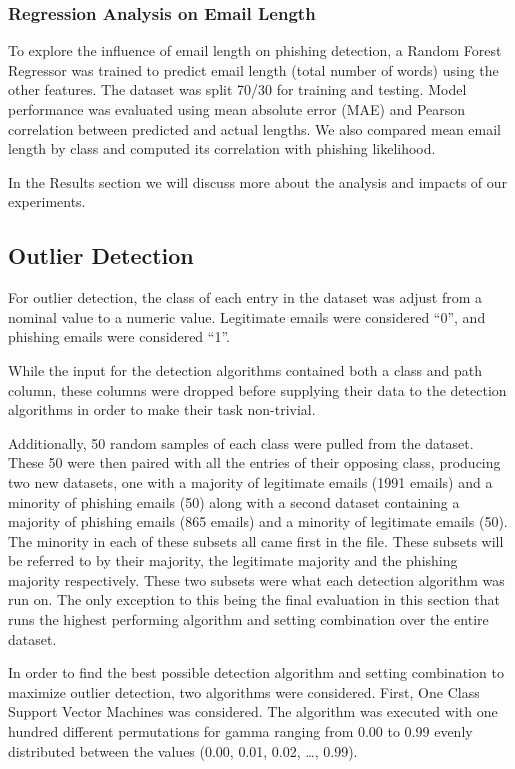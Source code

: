 \documentclass[article,pdftex,10pt,a4paper,twocolumn]{article}
\begin{document}
\subsubsection{Regression Analysis on Email Length}
\label{modelsregressionanalysisonemaillength}

To explore the influence of email length on phishing detection, a Random Forest Regressor was trained to predict email length (total number of words) using the other features. The dataset was split 70/30 for training and testing. Model performance was evaluated using mean absolute error (MAE) and Pearson correlation between predicted and actual lengths. We also compared mean email length by class and computed its correlation with phishing likelihood.

In the Results  section we will discuss more about the analysis and impacts of our experiments.

\subsection{Outlier Detection}
\label{methodsoutlierdetection}

For outlier detection, the class of each entry in the dataset was adjust from a nominal value to a numeric value. Legitimate emails were considered “0”, and phishing emails were considered “1”.

While the input for the detection algorithms contained both a class and path column, these columns were dropped before supplying their data to the detection algorithms in order to make their task non-trivial.

Additionally, 50 random samples of each class were pulled from the dataset. These 50 were then paired with all the entries of their opposing class, producing two new datasets, one with a majority of legitimate emails (1991 emails) and a minority of phishing emails (50) along with a second dataset containing a majority of phishing emails (865 emails) and a minority of legitimate emails (50). The minority in each of these subsets all came first in the file. These subsets will be referred to by their majority, the legitimate majority and the phishing majority respectively. These two subsets were what each detection algorithm was run on. The only exception to this being the final evaluation in this section that runs the highest performing algorithm and setting combination over the entire dataset.

In order to find the best possible detection algorithm and setting combination to maximize outlier detection, two algorithms were considered. First, One Class Support Vector Machines was considered. The algorithm was executed with one hundred different permutations for gamma ranging from 0.00 to 0.99 evenly distributed between the values (0.00, 0.01, 0.02, …, 0.99).
\end{document}

